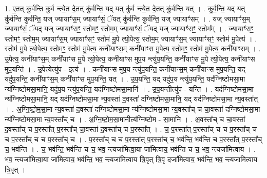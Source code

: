 \documentclass[17pt]{extarticle}
\begin{document}
1. ए॒तत् कु॑र्वन्ति कुर्व न्त्ये॒त दे॒तत् कु॑र्वन्ति॒ यद् यत् कु॑र्व न्त्ये॒त दे॒तत् कु॑र्वन्ति॒ यत् । . कु॒र्व॒न्ति॒ यद् यत् कु॑र्वन्ति कुर्वन्ति॒ यज् ज्यायाꣳ॑स॒म् ज्यायाꣳ॑सं॒ ॅयत् कु॑र्वन्ति कुर्वन्ति॒ यज् ज्यायाꣳ॑सम् । . यज् ज्यायाꣳ॑स॒म् ज्यायाꣳ॑सं॒ ॅयद् यज् ज्यायाꣳ॑सꣳ॒॒ स्तोमꣳ॒॒ स्तोम॒म् ज्यायाꣳ॑सं॒ ॅयद् यज् ज्यायाꣳ॑सꣳ॒॒ स्तोम᳚म् । . ज्यायाꣳ॑सꣳ॒॒ स्तोमꣳ॒॒ स्तोम॒म् ज्यायाꣳ॑स॒म् ज्यायाꣳ॑सꣳ॒॒ स्तोम॑ मु॒पे त्यो॒पेत्य॒ स्तोम॒म् ज्यायाꣳ॑स॒म् ज्यायाꣳ॑सꣳ॒॒ स्तोम॑ मु॒पेत्य॑ । . स्तोम॑ मु॒पे त्यो॒पेत्य॒ स्तोमꣳ॒॒ स्तोम॑ मु॒पेत्य॒ कनी॑याꣳस॒म् कनी॑याꣳस मु॒पेत्य॒ स्तोमꣳ॒॒ स्तोम॑ मु॒पेत्य॒ कनी॑याꣳसम् । . उ॒पेत्य॒ कनी॑याꣳस॒म् कनी॑याꣳस मु॒पे त्यो॒पेत्य॒ कनी॑याꣳस मुप॒य न्त्यु॑प॒यन्ति॒ कनी॑याꣳस मु॒पे त्यो॒पेत्य॒ कनी॑याꣳस मुप॒यन्ति॑ । . उ॒पेत्येत्यु॑प - इत्य॑ । . कनी॑याꣳस मुप॒य न्त्यु॑प॒यन्ति॒ कनी॑याꣳस॒म् कनी॑याꣳस मुप॒यन्ति॒ यद् यदु॑प॒यन्ति॒ कनी॑याꣳस॒म् कनी॑याꣳस मुप॒यन्ति॒ यत् । . उ॒प॒यन्ति॒ यद् यदु॑प॒य न्त्यु॑प॒यन्ति॒ यद॑ग्निष्टोमसा॒मा न्य॑ग्निष्टोमसा॒मानि॒ यदु॑प॒य न्त्यु॑प॒यन्ति॒ यद॑ग्निष्टोमसा॒मानि॑ । . उ॒प॒यन्तीत्यु॑प - यन्ति॑ । . यद॑ग्निष्टोमसा॒मा न्य॑ग्निष्टोमसा॒मानि॒ यद् यद॑ग्निष्टोमसा॒मा न्य॒वस्ता॑ द॒वस्ता॑ दग्निष्टोमसा॒मानि॒ यद् यद॑ग्निष्टोमसा॒मा न्य॒वस्ता᳚त् । . अ॒ग्नि॒ष्टो॒म॒सा॒मा न्य॒वस्ता॑ द॒वस्ता॑ दग्निष्टोमसा॒मा न्य॑ग्निष्टोमसा॒मा न्य॒वस्ता᳚च् च चा॒वस्ता॑ दग्निष्टोमसा॒मा न्य॑ग्निष्टोमसा॒मा न्य॒वस्ता᳚च् च । . अ॒ग्नि॒ष्टो॒म॒सा॒मानीत्य॑ग्निष्टोम - सा॒मानि॑ । . अ॒वस्ता᳚च् च चा॒वस्ता॑ द॒वस्ता᳚च् च प॒रस्ता᳚त् प॒रस्ता᳚च् चा॒वस्ता॑ द॒वस्ता᳚च् च प॒रस्ता᳚त् । . च॒ प॒रस्ता᳚त् प॒रस्ता᳚च् च च प॒रस्ता᳚च् च च प॒रस्ता᳚च् च च प॒रस्ता᳚च् च । . प॒रस्ता᳚च् च च प॒रस्ता᳚त् प॒रस्ता᳚च् च॒ भव॑न्ति॒ भव॑न्ति च प॒रस्ता᳚त् प॒रस्ता᳚च् च॒ भव॑न्ति । . च॒ भव॑न्ति॒ भव॑न्ति च च॒ भव॒ न्त्यजा॑मित्वा॒या जा॑मित्वाय॒ भव॑न्ति च च॒ भव॒ न्त्यजा॑मित्वाय । . भव॒ न्त्यजा॑मित्वा॒या जा॑मित्वाय॒ भव॑न्ति॒ भव॒ न्त्यजा॑मित्वाय त्रि॒वृत् त्रि॒वृ दजा॑मित्वाय॒ भव॑न्ति॒ भव॒ न्त्यजा॑मित्वाय त्रि॒वृत् । \newline
\end{document}
